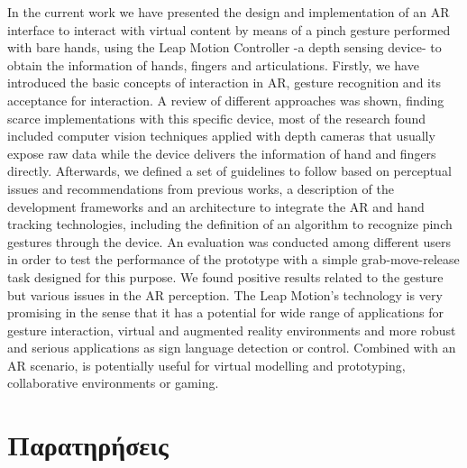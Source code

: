 In the current work we have presented the design and implementation of an AR interface to interact with virtual content by means of a pinch gesture performed with bare hands, using the Leap Motion Controller -a depth sensing device- to obtain the information of hands, fingers and articulations. Firstly, we have introduced the basic concepts of interaction in AR, gesture recognition and its acceptance for interaction. A review of different approaches was shown, finding scarce implementations with this specific device, most of the research found included computer vision techniques applied with depth cameras that usually expose raw data while the device delivers the information of hand and fingers directly. Afterwards, we defined a set of guidelines to follow based on perceptual issues and recommendations from previous works, a description of the development frameworks and an architecture to integrate the AR and hand tracking technologies, including the definition of an algorithm to recognize pinch gestures through the device. An evaluation was conducted among different users in order to test the performance of the prototype with a simple grab-move-release task designed for this purpose. We found positive results related to the gesture but various issues in the AR perception. The Leap Motion’s technology is very promising in the sense that it has a potential for wide range of applications for gesture interaction, virtual and augmented reality environments and more robust and serious applications as sign language detection or control. Combined with an AR scenario, is potentially useful for virtual modelling and prototyping, collaborative environments or gaming.

\section{Παρατηρήσεις}


